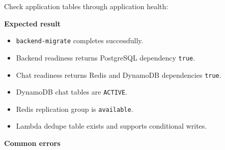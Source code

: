 Check application tables through application health:

\begin{Shaded}
\begin{Highlighting}[]
\OperatorTok{=}
\OperatorTok{=}
 
 
\end{Highlighting}
\end{Shaded}

\vspace{0.5em}\noindent\textbf{Expected result}\par

\begin{itemize}
\tightlist
\item
  \texttt{backend-\allowbreak{}migrate} completes successfully.
\item
  Backend readiness returns PostgreSQL dependency \texttt{true}.
\item
  Chat readiness returns Redis and DynamoDB dependencies \texttt{true}.
\item
  DynamoDB chat tables are \texttt{ACTIVE}.
\item
  Redis replication group is \texttt{available}.
\item
  Lambda dedupe table exists and supports conditional writes.
\end{itemize}

\vspace{0.5em}\noindent\textbf{Common errors}\par

